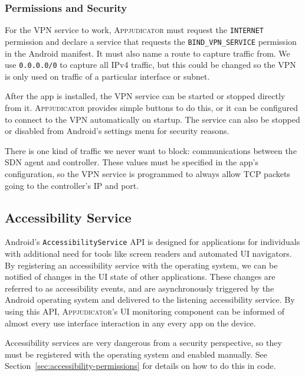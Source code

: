 \subsubsection{Permissions and Security}
\label{sec:vpn-permissions}

For the VPN service to work, \textsc{Appjudicator} must request the
\texttt{INTERNET} permission and declare a service that requests the
\texttt{BIND\_VPN\_SERVICE} permission in the Android manifest. It must also
name a route to capture traffic from. We use \texttt{0.0.0.0/0} to capture all
IPv4 traffic, but this could be changed so the VPN is only used on traffic of a
particular interface or subnet.

After the app is installed, the VPN service can be started or stopped directly
from it. \textsc{Appjudicator} provides simple buttons to do this, or it can be
configured to connect to the VPN automatically on startup. The service can also
be stopped or disabled from Android's settings menu for security reasons.

There is one kind of traffic we never want to block: communications between the
SDN agent and controller. These values must be specified in the app's
configuration, so the VPN service is programmed to always allow TCP packets
going to the controller's IP and port.

\subsection{Accessibility Service}
\label{sec:implementation-accessibility-service}

Android's \texttt{AccessibilityService} API is designed for applications for
individuals with additional need for tools like screen readers and automated UI
navigators. By registering an accessibility service with the operating system,
we can be notified of changes in the UI state of other applications. These
changes are referred to as accessibility events, and are asynchronously
triggered by the Android operating system and delivered to the listening
accessibility service. By using this API, \textsc{Appjudicator}'s UI monitoring
component can be informed of almost every use interface interaction in any every
app on the device.

Accessibility services are very dangerous from a security perspective, so they
must be registered with the operating system and enabled manually. See
Section~\ref{sec:accessibility-permissions} for details on how to do this in
code.

